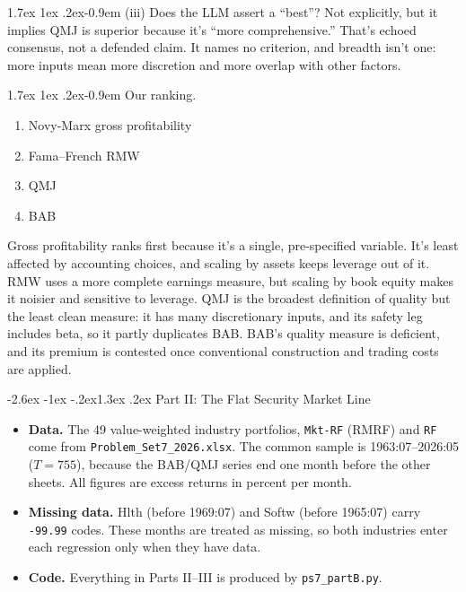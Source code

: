 \documentclass[11pt]{article}
\makeatletter
\renewcommand\section{\@startsection{section}{1}{0pt}%
  {-2.6ex \@plus -1ex \@minus -.2ex}{1.3ex \@plus .2ex}%
  {\normalfont\scshape\large\color{psink}}}   %
\renewcommand\paragraph{\@startsection{paragraph}{4}{0pt}%
  {1.7ex \@plus 1ex \@minus .2ex}{-0.9em}%
  {\normalfont\bfseries\normalsize\color{psink}}}
\makeatother
\begin{document}
\paragraph{(iii)}
Does the LLM assert a ``best''? Not explicitly, but it implies QMJ is superior because it's ``more comprehensive.'' That's echoed consensus, not a defended claim. It names no criterion, and breadth isn't one: more inputs mean more discretion and more overlap with other factors.

\paragraph{Our ranking.}
\begin{enumerate}\setlength{\itemsep}{1pt}
  \item Novy-Marx gross profitability
  \item Fama--French RMW
  \item QMJ
  \item BAB
\end{enumerate}
Gross profitability ranks first because it's a single, pre-specified variable. It's least affected by accounting choices, and scaling by assets keeps leverage out of it. RMW uses a more complete earnings measure, but scaling by book equity makes it noisier and sensitive to leverage. QMJ is the broadest definition of quality but the least clean measure: it has many discretionary inputs, and its safety leg includes beta, so it partly duplicates BAB. BAB's quality measure is deficient, and its premium is contested once conventional construction and trading costs are applied.


\section{Part II: The Flat Security Market Line}

\begin{itemize}
  \item \textbf{Data.} The 49 value-weighted industry portfolios, \texttt{Mkt-RF} (RMRF) and \texttt{RF} come from \texttt{Problem\_\allowbreak{}Set7\_\allowbreak{}2026.xlsx}. The common sample is 1963:07--2026:05 ($T=755$), because the BAB/QMJ series end one month before the other sheets. All figures are excess returns in percent per month.
  \item \textbf{Missing data.} Hlth (before 1969:07) and Softw (before 1965:07) carry \texttt{-99.99} codes. These months are treated as missing, so both industries enter each regression only when they have data.
  \item \textbf{Code.} Everything in Parts II--III is produced by \texttt{ps7\_partB.py}.
\end{itemize}
\end{document}
